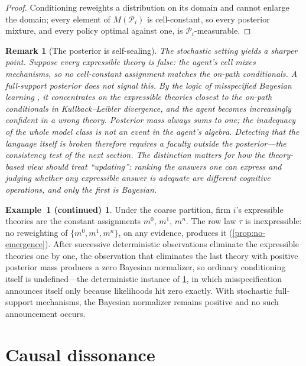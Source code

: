 \documentclass[11pt]{article}
\newtheorem{remark}[assumption]{Remark}
\theoremstyle{definition}
\newtheorem*{excont}{Example~1 (continued)}
\begin{document}
\begin{proof}
Conditioning reweights a distribution on its domain and cannot enlarge the domain; every element of $M(\mathcal P_i)$ is cell-constant, so every posterior mixture, and every policy optimal against one, is $\mathcal P_i$-measurable.
\end{proof}

\begin{remark}[The posterior is self-sealing]
\label{rem:self-sealing}
The stochastic setting yields a sharper point.
Suppose every expressible theory is false: the agent's cell mixes mechanisms, so no cell-constant assignment matches the on-path conditionals.
A full-support posterior does not signal this.
By the logic of misspecified Bayesian learning \citep{Berk1966}, it concentrates on the expressible theories closest to the on-path conditionals in Kullback--Leibler divergence, and the agent becomes increasingly \emph{confident} in a wrong theory.
Posterior mass always sums to one; the inadequacy of the whole model class is not an event in the agent's algebra.
Detecting that the language itself is broken therefore requires a faculty outside the posterior---the consistency test of the next section.
The distinction matters for how the theory-based view should treat ``updating'': ranking the answers one can express and judging whether any expressible answer is adequate are different cognitive operations, and only the first is Bayesian.
\end{remark}

\begin{excont}
Under the coarse partition, firm $i$'s expressible theories are the constant assignments $m^0$, $m^1$, $m^n$.
The row law $\tau$ is inexpressible: no reweighting of $\{m^0,m^1,m^n\}$, on any evidence, produces it (\cref{prop:no-emergence}).
After successive deterministic observations eliminate the expressible theories one by one, the observation that eliminates the last theory with positive posterior mass produces a zero Bayesian normalizer, so ordinary conditioning itself is undefined---the deterministic instance of \cref{rem:self-sealing}, in which misspecification announces itself only because likelihoods hit zero exactly.
With stochastic full-support mechanisms, the Bayesian normalizer remains positive and no such announcement occurs.
\end{excont}
\section{Causal dissonance}
\label{sec:dissonance}
\end{document}
